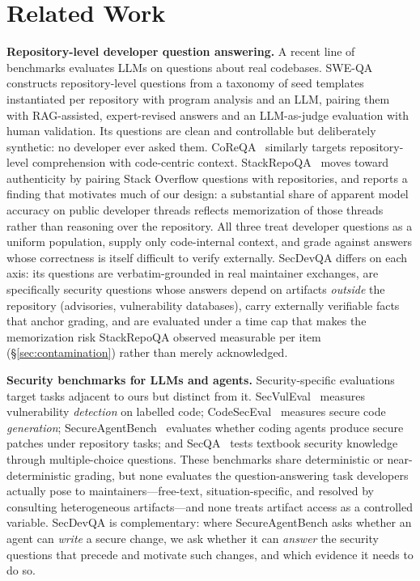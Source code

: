 \section{Related Work}
\label{sec:related}

\noindent\textbf{Repository-level developer question answering.}
A recent line of benchmarks evaluates LLMs on questions about real codebases.
SWE-QA~\cite{sweqa2026} constructs repository-level questions from a taxonomy of
seed templates instantiated per repository with program analysis and an LLM,
pairing them with RAG-assisted, expert-revised answers and an LLM-as-judge
evaluation with human validation. Its questions are clean and controllable but
deliberately synthetic: no developer ever asked them. CoReQA~\cite{coreqa2025}
similarly targets repository-level comprehension with code-centric context.
StackRepoQA~\cite{stackrepoqa2025} moves toward authenticity by pairing Stack
Overflow questions with repositories, and reports a finding that motivates much
of our design: a substantial share of apparent model accuracy on public
developer threads reflects memorization of those threads rather than reasoning
over the repository. All three treat developer questions as a uniform
population, supply only code-internal context, and grade against answers whose
correctness is itself difficult to verify externally. SecDevQA differs on each
axis: its questions are verbatim-grounded in real maintainer exchanges, are
specifically security questions whose answers depend on artifacts \emph{outside}
the repository (advisories, vulnerability databases), carry externally
verifiable facts that anchor grading, and are evaluated under a time cap
that makes the memorization risk StackRepoQA observed measurable per item
(\S\ref{sec:contamination}) rather than merely acknowledged.

\noindent\textbf{Security benchmarks for LLMs and agents.}
Security-specific evaluations target tasks adjacent to ours but distinct from
it. SecVulEval~\cite{secvuleval2025} measures vulnerability \emph{detection} on
labelled code; CodeSecEval~\cite{codeseceval2024} measures secure code
\emph{generation}; SecureAgentBench~\cite{secureagentbench2025} evaluates
whether coding agents produce secure patches under repository tasks; and
SecQA~\cite{secqa2023} tests textbook security knowledge through
multiple-choice questions. These benchmarks share deterministic or
near-deterministic grading, but none evaluates the question-answering task
developers actually pose to maintainers---free-text, situation-specific, and
resolved by consulting heterogeneous artifacts---and none treats artifact
access as a controlled variable. SecDevQA is complementary: where
SecureAgentBench asks whether an agent can \emph{write} a secure change, we ask
whether it can \emph{answer} the security questions that precede and motivate
such changes, and which evidence it needs to do so.

